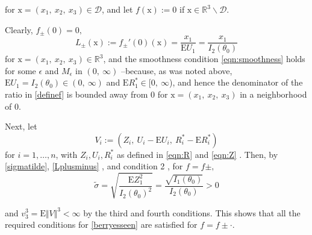 for $\mathrm{x}=(x_{1},\ x_{2},\ x_{3})\in \mathcal{D}$, and let $f(\mathrm{x}) :=0$ if $\mathrm{x}\in \mathbb{R}^{3}\backslash \mathcal{D}$. 

Clearly, $f_{\pm}(0)=0,$
\begin{equation}\label{Lplusminus}
	L_{\pm}(\displaystyle \mathrm{x}):=f_{\pm}'(0)(\mathrm{x})=\frac{x_{1}}{\mathrm{E}U_{1}}=\frac{x_{1}}{I_2(\theta_{0})}
\end{equation}
for $\mathrm{x}=(x_{1},\ x_{2},\ x_{3})\in \mathbb{R}^{3}$, and the smoothness condition \eqref{eqn:smoothness} holds for some $\epsilon$ and $M_{\epsilon}$ in $(0,\ \infty)$ --because, as was noted above, $\mathrm{E}U_{1}=I_2(\theta_{0})\in(0,\ \infty)$ and $\mathrm{E}R_{1}^{*}\in[0,\ \infty$), and hence the denominator of the ratio in \eqref{definef} is bounded away from $0$ for $\mathrm{x}=(x_{1},\ x_{2},\ x_{3})$ in a neighborhood of $0.$

Next, let
\begin{equation}\label{Vi}
	V_{i}:=(Z_{i},\ U_{i}-\mathrm{E}U_{i},\ R_{i}^{*}-\mathrm{E}R_{i}^{*})
\end{equation}
for $i=1,\ldots,n$, with $Z_{i}, U_{i}, R_{i}^{*}$ as defined in \eqref{eqn:R} and \eqref{eqn:Z} . Then, by \eqref{sigmatilde}, \eqref{Lplusminus} , and condition 2 , for $f=f\pm,$
\begin{equation}\label{sigmatilde1}
	\tilde{\sigma} = \sqrt{\frac{\mathrm{E}Z_{1}^{2}}{I_2(\theta_{0})^{2}}}=\frac{\sqrt{I_1(\theta_0)}}{I_2(\theta_{0})}>0
\end{equation}

and $ v_{3}^{3}=\mathrm{E}\Vert V\Vert^{3}<\infty$ by the third and fourth conditions. This shows that all the required conditions for \eqref{berryesseen} are satisfied for $ f=f\pm\cdot$.

